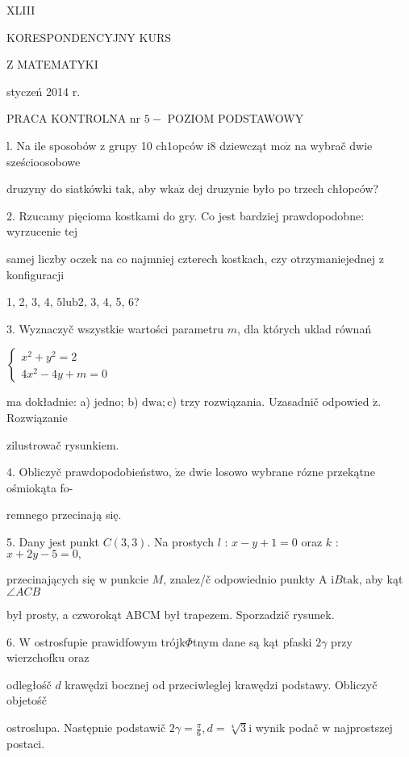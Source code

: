 \documentclass[a4paper,12pt]{article}
\begin{document}
XLIII

KORESPONDENCYJNY KURS

Z MATEMATYKI

styczeń 2014 r.

PRACA KONTROLNA nr $5-$ POZIOM PODSTAWOWY

l. Na ile sposobów $\mathrm{z}$ grupy 10 ch1opców $\mathrm{i}8$ dziewcząt $\mathrm{m}\mathrm{o}\dot{\mathrm{z}}$ na wybrač dwie sześcioosobowe

druzyny do siatkówki $\mathrm{t}\mathrm{a}\mathrm{k}$, aby $\mathrm{w}\mathrm{k}\mathrm{a}\dot{\mathrm{z}}$ dej druzynie było po trzech chłopców?

2. Rzucamy pięcioma kostkami do gry. Co jest bardziej prawdopodobne: wyrzucenie tej

samej liczby oczek na co najmniej czterech kostkach, czy otrzymaniejednej $\mathrm{z}$ konfiguracji

1, 2, 3, 4, $5\mathrm{l}\mathrm{u}\mathrm{b}2$, 3, 4, 5, 6?

3. Wyznaczyč wszystkie wartości parametru $m$, dla których uklad równań

$\left\{\begin{array}{l}
x^{2}+y^{2}=2\\
4x^{2}-4y+m=0
\end{array}\right.$

ma dokładnie: a) jedno; b) $\mathrm{d}\mathrm{w}\mathrm{a};\mathrm{c}$) trzy rozwiązania. Uzasadnič odpowied $\acute{\mathrm{z}}$. Rozwiązanie

zilustrowač rysunkiem.

4. Obliczyč prawdopodobieństwo, $\dot{\mathrm{z}}\mathrm{e}$ dwie losowo wybrane rózne przekątne ośmiokąta fo-

remnego przecinają się.

5. Dany jest punkt $C(3,3)$. Na prostych $l$ : $x-y+1 = 0$ oraz $k$ : $x+2y-5 = 0,$

przecinających się $\mathrm{w}$ punkcie $M$, znalez/č odpowiednio punkty A $\mathrm{i}B\mathrm{t}\mathrm{a}\mathrm{k}$, aby kąt $\angle ACB$

był prosty, a czworokąt ABCM był trapezem. Sporzadzič rysunek.

6. $\mathrm{W}$ ostrosfupie prawidfowym trójk$\Phi$tnym dane są kąt pfaski $ 2\gamma$ przy wierzchofku oraz

odległośč $d$ krawędzi bocznej od przeciwleglej krawędzi podstawy. Obliczyč objetośč

ostroslupa. Następnie podstawič $2\displaystyle \gamma=\frac{\pi}{6}, d=\sqrt[4]{3} \mathrm{i}$ wynik podač $\mathrm{w}$ najprostszej postaci.
\end{document}
